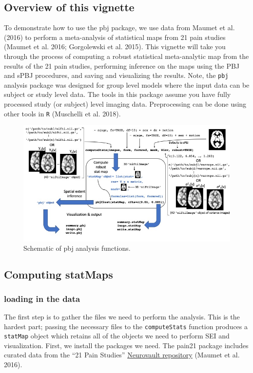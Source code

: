 \documentclass[]{article}
\begin{document}
\subsection{Overview of this vignette}\label{overview-of-this-vignette}

To demonstrate how to use the pbj package, we use data from Maumet et
al. (2016) to perform a meta-analysis of statistical maps from 21 pain
studies (Maumet et al. 2016; Gorgolewski et al. 2015). This vignette
will take you through the process of computing a robust statistical
meta-analytic map from the results of the 21 pain studies, performing
inference on the maps using the PBJ and sPBJ procedures, and saving and
visualizing the results. Note, the \texttt{pbj} analysis package was
designed for group level models where the input data can be subject or
study level data. The tools in this package assume you have fully
processed study (or subject) level imaging data. Preprocessing can be
done using other tools in \texttt{R} (Muschelli et al. 2018).

\begin{figure}
\centering
\includegraphics{pbj_schematic.jpg}
\caption{Schematic of pbj analysis functions.}
\end{figure}

\subsection{Computing statMaps}\label{computing-statmaps}

\subsubsection{loading in the data}\label{loading-in-the-data}

The first step is to gather the files we need to perform the analysis.
This is the hardest part; passing the necessary files to the
\texttt{computeStats} function produces a \texttt{statMap} object which
retains all of the objects we need to perform SEI and visualization.
First, we install the packages we need. The pain21 package includes
curated data from the ``21 Pain Studies''
\href{https://neurovault.org/collections/1425/}{Neurovault repository}
(Maumet et al. 2016).
\end{document}
